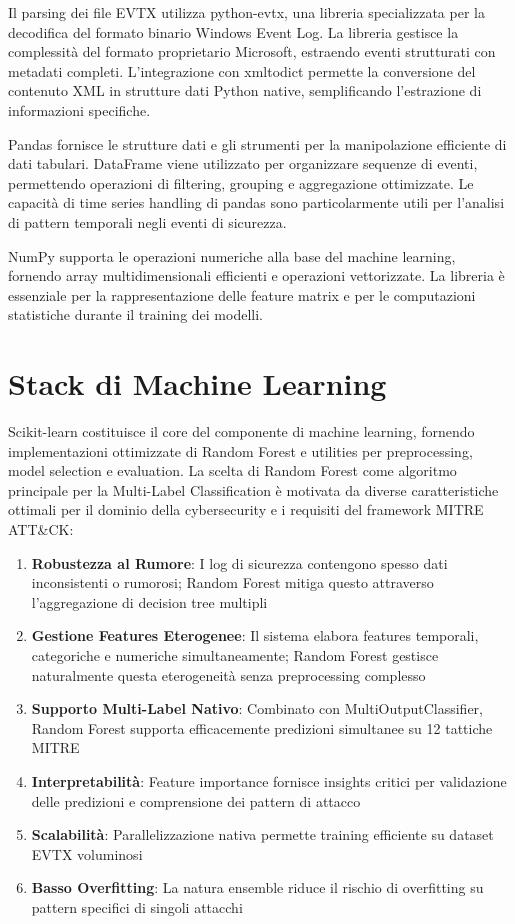 \documentclass[12pt,a4paper]{report}
\theoremstyle{definition}
\begin{document}
Il parsing dei file EVTX utilizza python-evtx, una libreria specializzata per la decodifica del formato binario Windows Event Log. La libreria gestisce la complessità del formato proprietario Microsoft, estraendo eventi strutturati con metadati completi. L'integrazione con xmltodict permette la conversione del contenuto XML in strutture dati Python native, semplificando l'estrazione di informazioni specifiche.

Pandas fornisce le strutture dati e gli strumenti per la manipolazione efficiente di dati tabulari. DataFrame viene utilizzato per organizzare sequenze di eventi, permettendo operazioni di filtering, grouping e aggregazione ottimizzate. Le capacità di time series handling di pandas sono particolarmente utili per l'analisi di pattern temporali negli eventi di sicurezza.

NumPy supporta le operazioni numeriche alla base del machine learning, fornendo array multidimensionali efficienti e operazioni vettorizzate. La libreria è essenziale per la rappresentazione delle feature matrix e per le computazioni statistiche durante il training dei modelli.

\section{Stack di Machine Learning}

Scikit-learn costituisce il core del componente di machine learning, fornendo implementazioni ottimizzate di Random Forest e utilities per preprocessing, model selection e evaluation. 
La scelta di Random Forest come algoritmo principale per la Multi-Label Classification è motivata da diverse caratteristiche ottimali per il dominio della cybersecurity e i requisiti del framework MITRE ATT\&CK:

\begin{enumerate}
\item \textbf{Robustezza al Rumore}: I log di sicurezza contengono spesso dati inconsistenti o rumorosi; Random Forest mitiga questo attraverso l'aggregazione di decision tree multipli
\item \textbf{Gestione Features Eterogenee}: Il sistema elabora features temporali, categoriche e numeriche simultaneamente; Random Forest gestisce naturalmente questa eterogeneità senza preprocessing complesso
\item \textbf{Supporto Multi-Label Nativo}: Combinato con MultiOutputClassifier, Random Forest supporta efficacemente predizioni simultanee su 12 tattiche MITRE
\item \textbf{Interpretabilità}: Feature importance fornisce insights critici per validazione delle predizioni e comprensione dei pattern di attacco
\item \textbf{Scalabilità}: Parallelizzazione nativa permette training efficiente su dataset EVTX voluminosi
\item \textbf{Basso Overfitting}: La natura ensemble riduce il rischio di overfitting su pattern specifici di singoli attacchi
\end{enumerate}
\end{document}
